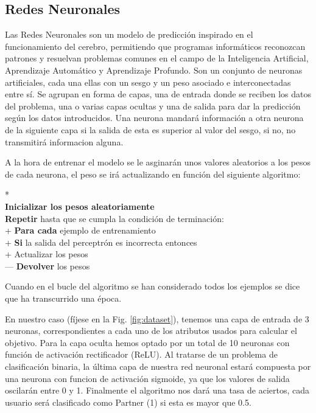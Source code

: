 \documentclass[conference,a4paper]{IEEEtran}
\begin{document}
\subsection{Redes Neuronales}

Las Redes Neuronales son un modelo de predicción inspirado en el funcionamiento del cerebro, permitiendo que programas informáticos reconozcan patrones y resuelvan problemas comunes en el campo de la Inteligencia Artificial, Aprendizaje Automático y Aprendizaje Profundo. Son un conjunto de neuronas artificiales, cada una ellas con un sesgo y un peso asociado e interconectadas entre sí. Se agrupan en forma de capas, una de entrada donde se reciben los datos del problema, una o varias capas ocultas y una de salida para dar la predicción según los datos introducidos. Una neurona mandará información a otra neurona de la siguiente capa si la salida de esta es superior al valor del sesgo, si no, no transmitirá informacion alguna.

A la hora de entrenar el modelo se le asginarán unos valores aleatorios a los pesos de cada neurona, el peso se irá actualizando en función del siguiente algoritmo:

\begin{pseudo}*
    \\
    \textbf{\textnormal{Inicializar los pesos aleatoriamente}} \\
    \textbf{Repetir}\textnormal{ hasta que se cumpla la condición de terminación: }\\+
    \textbf{Para cada}\textnormal{ ejemplo de entrenamiento}\\+
    \textbf{Si} \textnormal{la salida del perceptrón es incorrecta entonces}\\+
         \textnormal{Actualizar los pesos}\\---
    \textbf{Devolver}\textnormal{ los pesos}\\
 \end{pseudo}

Cuando en el bucle del algoritmo se han considerado todos los ejemplos se dice que ha transcurrido una época.

En nuestro caso (fíjese en la Fig. \ref{fig:dataset}), tenemos una capa de entrada de 3 neuronas, correspondientes a cada uno de los atributos usados para calcular el objetivo. Para la capa oculta hemos optado por un total de 10 neuronas con función de activación rectificador (ReLU). Al tratarse de un problema de clasificación binaria, la última capa de nuestra red neuronal estará compuesta por una neurona con funcion de activación sigmoide, ya que los valores de salida oscilarán entre 0 y 1. Finalmente el algoritmo nos dará una tasa de aciertos, cada usuario será clasificado como Partner (1) si esta es mayor que 0.5.
\end{document}
